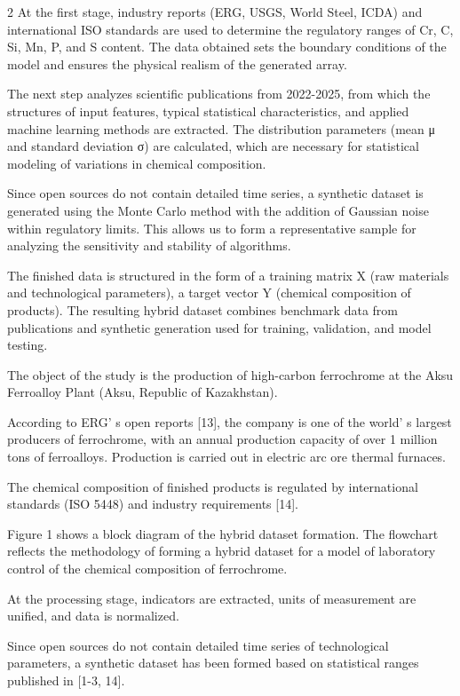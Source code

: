 \begin{multicols}{2}
At the first stage, industry reports (ERG, USGS, World Steel, ICDA) and
international ISO standards are used to determine the regulatory ranges
of Cr, C, Si, Mn, P, and S content. The data obtained sets the boundary
conditions of the model and ensures the physical realism of the
generated array.

The next step analyzes scientific publications from 2022-2025, from
which the structures of input features, typical statistical
characteristics, and applied machine learning methods are extracted. The
distribution parameters (mean μ and standard deviation σ) are
calculated, which are necessary for statistical modeling of variations
in chemical composition.

Since open sources do not contain detailed time series, a synthetic
dataset is generated using the Monte Carlo method with the addition of
Gaussian noise within regulatory limits. This allows us to form a
representative sample for analyzing the sensitivity and stability of
algorithms.

The finished data is structured in the form of a training matrix X (raw
materials and technological parameters), a target vector Y (chemical
composition of products). The resulting hybrid dataset combines
benchmark data from publications and synthetic generation used for
training, validation, and model testing.

The object of the study is the production of high-carbon ferrochrome at
the Aksu Ferroalloy Plant (Aksu, Republic of Kazakhstan).

According to ERG' s open reports {[}13{]}, the company is
one of the world' s largest producers of ferrochrome,
with an annual production capacity of over 1 million tons of
ferroalloys. Production is carried out in electric arc ore thermal
furnaces.

The chemical composition of finished products is regulated by
international standards (ISO 5448) and industry requirements {[}14{]}.

Figure 1 shows a block diagram of the hybrid dataset formation. The
flowchart reflects the methodology of forming a hybrid dataset for a
model of laboratory control of the chemical composition of ferrochrome.

At the processing stage, indicators are extracted, units of measurement
are unified, and data is normalized.

Since open sources do not contain detailed time series of technological
parameters, a synthetic dataset has been formed based on statistical
ranges published in {[}1-3, 14{]}.


\end{multicols}
